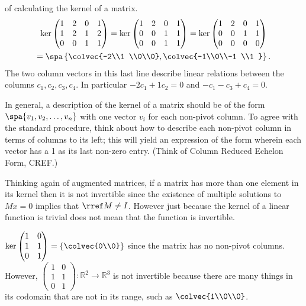 \begin{example} of calculating the kernel of a matrix.\\
\begin{gather*}
\ker 
\begin{pmatrix}
1&2&0&1 \\
1&2&1&2 \\
0&0&1&1
\end{pmatrix}
=
\ker 
\begin{pmatrix}
1&2&0&1 \\
0&0&1&1 \\
0&0&1&1
\end{pmatrix}
=
\ker 
\begin{pmatrix}
1&2&0&1 \\
0&0&1&1 \\
0&0&0&0
\end{pmatrix}
\\
=\spa \left\{ 
\colvec{-2\\1 \\0\\0}, \colvec{-1\\0\\-1 \\1 } 
 \right\} .
\end{gather*}
The two column vectors in this last line describe linear relations between the columns $c_1,c_2,c_3,c_4$. 
In particular $-2c_1+1c_2=0$ and $-c_1-c_3 +c_4=0$. 
\end{example}
In general, a description of the kernel of a matrix should be of the form 
$\spa \{ v_1,v_2,\dots,v_n\}$ with one vector $v_i$ for each non-pivot column. 
To agree with the standard procedure, think about how to describe each non-pivot column in terms of columns to its left; this will yield an expression of the form wherein each vector  has a 1 as its last non-zero entry. (Think of Column Reduced Echelon Form, CREF.) 

Thinking again of augmented matrices, 
if a matrix has more than one element in its kernel then it is not invertible since the existence of multiple solutions to $Mx=0$ implies that $\rref M\neq I$. 
However just because the kernel of a linear function is trivial does not mean that the function is invertible. 

\begin{example}
$\ker 
\begin{pmatrix}
1&0\\
1&1\\
0&1
\end{pmatrix} =\left\{  \colvec{0\\0} \right\} $
since the matrix has no non-pivot columns. However, 
$\begin{pmatrix}
1&0\\
1&1\\
0&1
\end{pmatrix}:  \mathbb{R}^2 \to \mathbb{R}^3$
is not invertible because there are many things in its codomain that are not in its range, such as  $\colvec{1\\0\\0}$. 
\end{example}

